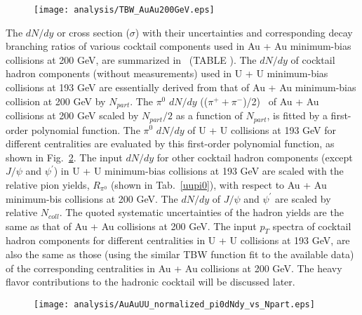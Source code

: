 \begin{figure}[htbp]
\centering
\texttt{[image: analysis/TBW\_AuAu200GeV.eps]}
 \label{tbwfit}
\end{figure}

The $dN/dy$ or cross section ($\sigma$) with their uncertainties and corresponding decay branching ratios of various cocktail components used in Au + Au minimum-bias collisions at 200 GeV, are summarized in~\cite{STAR:dielectron1} (TABLE \uppercase\expandafter{}). The $dN/dy$ of cocktail hadron components (without measurements) used in U + U minimum-bias collisions at 193 GeV are essentially derived from that of Au + Au minimum-bias collision at 200 GeV by $N_{part}$. The $\pi^{0}$ $dN/dy$ (($\pi^{+} + \pi^{-}$)/2)~\cite{IdentPartYieldsPRCLong} of Au + Au collisions at 200 GeV scaled by $N_{part}/2$ as a function of $N_{part}$, is fitted by a first-order polynomial function. The $\pi^{0}$ $dN/dy$ of U + U collisions at 193 GeV for different centralities are evaluated by this first-order polynomial function, as shown in Fig.~\ref{uupi0yields}. The input $dN/dy$ for other cocktail hadron components (except $J/\psi$ and $\psi^{\prime}$) in U + U minimum-bias collisions at 193 GeV are scaled with the relative pion yields, $R_{\pi^{0}}$ (shown in Tab.~\ref{uupi0}), with respect to Au + Au minimum-bis collisions at 200 GeV. The $dN/dy$ of $J/\psi$ and $\psi^{\prime}$ are scaled by relative $N_{coll}$. The quoted systematic uncertainties of the hadron yields are the same as that of Au + Au collisions at 200 GeV. The input $p_{T}$ spectra of cocktail hadron components for different centralities in U + U collisions at 193 GeV, are also the same as those (using the similar TBW function fit to the available data) of the corresponding centralities in Au + Au collisions at 200 GeV. The heavy flavor contributions to the hadronic cocktail will be discussed later.

\begin{figure}[htbp]
\centering
\texttt{[image: analysis/AuAuUU\_normalized\_pi0dNdy\_vs\_Npart.eps]}
 \label{uupi0yields}
\end{figure}

